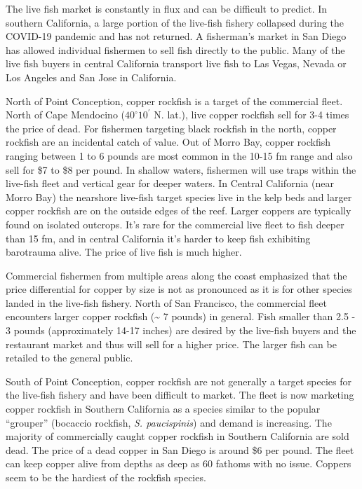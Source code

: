 \documentclass[11pt,
  english,
  letterpaper,
]{article}
\begin{document}
The live fish market is constantly in flux and can be difficult to predict. In southern California, a large portion of the live-fish fishery collapsed during the COVID-19 pandemic and has not returned. A fisherman's market in San Diego has allowed individual fishermen to sell fish directly to the public. Many of the live fish buyers in central California transport live fish to Las Vegas, Nevada or Los Angeles and San Jose in California.

North of Point Conception, copper rockfish is a target of the commercial fleet. North of Cape Mendocino ($40^\circ 10^\prime$ N. lat.), live copper rockfish sell for 3-4 times the price of dead. For fishermen targeting black rockfish in the north, copper rockfish are an incidental catch of value. Out of Morro Bay, copper rockfish ranging between 1 to 6 pounds are most common in the 10-15 fm range and also sell for \$7 to \$8 per pound. In shallow waters, fishermen will use traps within the live-fish fleet and vertical gear for deeper waters. In Central California (near Morro Bay) the nearshore live-fish target species live in the kelp beds and larger copper rockfish are on the outside edges of the reef. Larger coppers are typically found on isolated outcrops. It's rare for the commercial live fleet to fish deeper than 15 fm, and in central California it's harder to keep fish exhibiting barotrauma alive. The price of live fish is much higher.

Commercial fishermen from multiple areas along the coast emphasized that the price differential for copper by size is not as pronounced as it is for other species landed in the live-fish fishery. North of San Francisco, the commercial fleet encounters larger copper rockfish (\textasciitilde{} 7 pounds) in general. Fish smaller than 2.5 - 3 pounds (approximately 14-17 inches) are desired by the live-fish buyers and the restaurant market and thus will sell for a higher price. The larger fish can be retailed to the general public.

South of Point Conception, copper rockfish are not generally a target species for the live-fish fishery and have been difficult to market. The fleet is now marketing copper rockfish in Southern California as a species similar to the popular ``grouper'' (bocaccio rockfish, \emph{S. paucispinis}) and demand is increasing. The majority of commercially caught copper rockfish in Southern California are sold dead. The price of a dead copper in San Diego is around \$6 per pound. The fleet can keep copper alive from depths as deep as 60 fathoms with no issue. Coppers seem to be the hardiest of the rockfish species.
\end{document}
